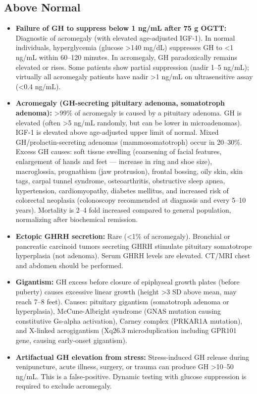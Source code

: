 \subsection*{Above Normal}
\begin{itemize}
  \item \textbf{Failure of GH to suppress below 1 ng/mL after 75 g OGTT:} Diagnostic of acromegaly (with elevated age-adjusted IGF-1). In normal individuals, hyperglycemia (glucose >140 mg/dL) suppresses GH to <1 ng/mL within 60--120 minutes. In acromegaly, GH paradoxically remains elevated or rises. Some patients show partial suppression (nadir 1--5 ng/mL); virtually all acromegaly patients have nadir >1 ng/mL on ultrasensitive assay (<0.4 ng/mL).
  \item \textbf{Acromegaly (GH-secreting pituitary adenoma, somatotroph adenoma):} >99\% of acromegaly is caused by a pituitary adenoma. GH is elevated (often >5 ng/mL randomly, but can be lower in microadenomas). IGF-1 is elevated above age-adjusted upper limit of normal. Mixed GH/prolactin-secreting adenomas (mammosomatotroph) occur in 20--30\%. Excess GH causes: soft tissue swelling (coarsening of facial features, enlargement of hands and feet --- increase in ring and shoe size), macroglossia, prognathism (jaw protrusion), frontal bossing, oily skin, skin tags, carpal tunnel syndrome, osteoarthritis, obstructive sleep apnea, hypertension, cardiomyopathy, diabetes mellitus, and increased risk of colorectal neoplasia (colonoscopy recommended at diagnosis and every 5--10 years). Mortality is 2--4 fold increased compared to general population, normalizing after biochemical remission.
  \item \textbf{Ectopic GHRH secretion:} Rare (<1\% of acromegaly). Bronchial or pancreatic carcinoid tumors secreting GHRH stimulate pituitary somatotrope hyperplasia (not adenoma). Serum GHRH levels are elevated. CT/MRI chest and abdomen should be performed.
  \item \textbf{Gigantism:} GH excess before closure of epiphyseal growth plates (before puberty) causes excessive linear growth (height >3 SD above mean, may reach 7--8 feet). Causes: pituitary gigantism (somatotroph adenoma or hyperplasia), McCune-Albright syndrome (GNAS mutation causing constitutive Gs-alpha activation), Carney complex (PRKAR1A mutation), and X-linked acrogigantism (Xq26.3 microduplication including GPR101 gene, causing early-onset gigantism).
  \item \textbf{Artifactual GH elevation from stress:} Stress-induced GH release during venipuncture, acute illness, surgery, or trauma can produce GH >10--50 ng/mL. This is a false-positive. Dynamic testing with glucose suppression is required to exclude acromegaly.

\end{itemize}
